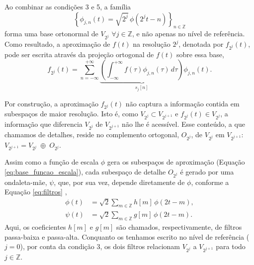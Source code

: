 Ao combinar as condições 3 e 5, a família
\begin{equation}
    \left\{ \phi_{j,n}(t) = \sqrt{2^{j}} \, \phi(2^j t - n) \right\}_{n \in \mathbb{Z}}
    \label{eq:base_funcao_escala}
\end{equation}
forma uma base ortonormal de \(V_{2^{j}}\) \(\forall j \in \mathbb{Z}\), e não apenas no nível de referência.
Como resultado, a aproximação de \(f(t)\) na resolução \(2^j\), denotada por \(f_{2^{j}}(t)\), pode ser escrita através da projeção ortogonal de \(f(t)\) sobre essa base,
\begin{equation}
    f_{2^j}(t) = \sum_{n = -\infty}^{+\infty} \underbrace{\left( \int_{-\infty}^{+\infty} f(\tau) \phi_{j,n}(\tau) \, d\tau \right)}_{s_j[n]} \phi_{j,n}(t).
    \label{eq:mra_approximation}
\end{equation}

Por construção, a aproximação \(f_{2^{j}}(t)\) não captura a informação contida em subespaços de maior resolução.
Isto é, como \(V_{2^j} \subset V_{2^{j+1}}\) e \(f_{2^{j}}(t) \in V_{2^j}\), a informação que diferencia \(V_{2^j}\) de \(V_{2^{j + 1}}\) não lhe é acessível.
Esse conteúdo, a que chamamos de detalhes, reside no complemento ortogonal, \(O_{2^j}\), de \(V_{2^j}\) em \(V_{2^{j+1}}\): \(V_{2^{j+1}} = V_{2^j} \;\oplus\; O_{2^j}\).

Assim como a função de escala \(\phi\) gera os subespaços de aproximação (Equação \ref{eq:base_funcao_escala}), cada subespaço de detalhe \(O_{2^j}\) é gerado por uma ondaleta-mãe, \(\psi\), que, por sua vez, depende diretamente de \(\phi\), conforme a Equação \ref{eq:filtros} ,
\begin{equation}
    \begin{aligned}
        \phi(t) &= \sqrt{2} \sum_{m \in \mathbb{Z}} h[m] \, \phi(2t - m), \\
        \psi(t) &= \sqrt{2} \sum_{m \in \mathbb{Z}} g[m] \, \phi(2t - m).
    \end{aligned}
    \label{eq:filtros}
\end{equation}
Aqui, os coeficientes \(h[m]\) e \(g[m]\) são chamados, respectivamente, de filtros passa-baixa e passa-alta. Conquanto os tenhamos escrito no nível de referência (\(j = 0\)), por conta da condição 3, os dois filtros relacionam \(V_{2^j}\) a \(V_{2^{j+1}}\) para todo \(j \in \mathbb{Z}\).

